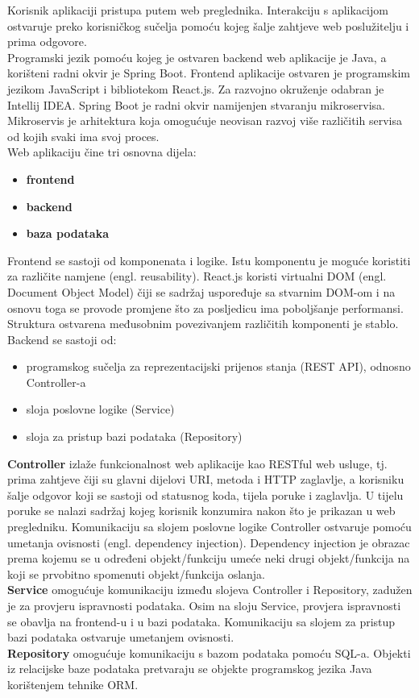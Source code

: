 	Korisnik aplikaciji pristupa putem web preglednika. Interakciju s aplikacijom ostvaruje preko korisničkog sučelja pomoću kojeg šalje zahtjeve web poslužitelju i prima odgovore.\\
Programski jezik pomoću kojeg je ostvaren backend web aplikacije je Java, a korišteni radni okvir je Spring Boot. Frontend aplikacije ostvaren je programskim jezikom JavaScript i bibliotekom React.js. Za razvojno okruženje odabran je Intellij IDEA. Spring Boot je radni okvir namijenjen stvaranju mikroservisa. Mikroservis je arhitektura koja omogućuje neovisan razvoj više različitih servisa od kojih svaki ima svoj proces.\\
Web aplikaciju čine tri osnovna dijela:
	\begin{itemize}
		\item 	\textbf{frontend}
		\item 	\textbf{backend}
		\item 	\textbf{baza podataka }		
	\end{itemize}
Frontend se sastoji od komponenata i logike. Istu komponentu je moguće koristiti za različite namjene (engl. reusability). React.js koristi virtualni DOM (engl. Document Object Model) čiji se sadržaj uspoređuje sa stvarnim DOM-om i na osnovu toga se provode promjene što za posljedicu ima poboljšanje performansi. Struktura ostvarena međusobnim povezivanjem različitih komponenti je stablo.\\
Backend se sastoji od: 
\begin{itemize}
		\item 	programskog sučelja za reprezentacijski prijenos stanja (REST API), odnosno Controller-a
		\item 	sloja poslovne logike (Service)
		\item 	sloja za pristup bazi podataka (Repository)		
	\end{itemize}
\textbf{Controller} izlaže funkcionalnost web aplikacije kao RESTful web usluge, tj. prima zahtjeve čiji su glavni dijelovi URI, metoda i HTTP zaglavlje, a korisniku šalje odgovor koji se sastoji od statusnog koda, tijela poruke i zaglavlja. U tijelu poruke se nalazi sadržaj kojeg korisnik konzumira nakon što je prikazan u web pregledniku. Komunikaciju sa slojem poslovne logike Controller ostvaruje pomoću umetanja ovisnosti (engl. dependency injection). Dependency injection je obrazac prema kojemu se u određeni objekt/funkciju umeće neki drugi objekt/funkcija na koji se prvobitno spomenuti objekt/funkcija oslanja.\\
\textbf{Service} omogućuje komunikaciju između slojeva Controller i Repository, zadužen je za provjeru ispravnosti podataka. Osim na sloju Service, provjera ispravnosti se obavlja na frontend-u i u bazi podataka. Komunikaciju sa slojem za pristup bazi podataka ostvaruje umetanjem ovisnosti.\\ 
\textbf{Repository} omogućuje komunikaciju s bazom podataka pomoću SQL-a. Objekti iz relacijske baze podataka pretvaraju se objekte programskog jezika Java korištenjem tehnike ORM.\\\\
		


